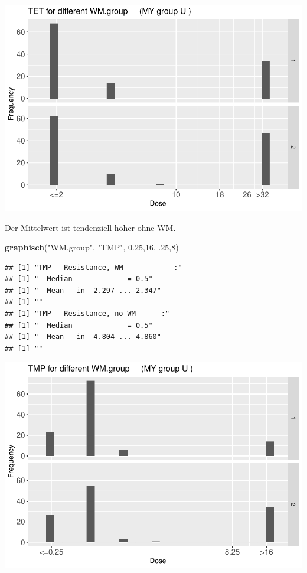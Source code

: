 \documentclass[
]{article}
\newenvironment{Shaded}{\begin{snugshade}}{\end{snugshade}}
\newcommand{\DecValTok}[1]{\textcolor[rgb]{0.00,0.00,0.81}{#1}}
\newcommand{\FloatTok}[1]{\textcolor[rgb]{0.00,0.00,0.81}{#1}}
\newcommand{\KeywordTok}[1]{\textcolor[rgb]{0.13,0.29,0.53}{\textbf{#1}}}
\newcommand{\NormalTok}[1]{#1}
\newcommand{\StringTok}[1]{\textcolor[rgb]{0.31,0.60,0.02}{#1}}
\begin{document}
\includegraphics{Verteilungen_files/figure-latex/unnamed-chunk-41-1.pdf}

Der Mittelwert ist tendenziell höher ohne WM.

\begin{Shaded}
\begin{Highlighting}[]
  \KeywordTok{graphisch}\NormalTok{(}\StringTok{"WM.group"}\NormalTok{, }\StringTok{"TMP"}\NormalTok{, }\FloatTok{0.25}\NormalTok{,}\DecValTok{16}\NormalTok{, }\FloatTok{.25}\NormalTok{,}\DecValTok{8}\NormalTok{) }
\end{Highlighting}
\end{Shaded}

\begin{verbatim}
## [1] "TMP - Resistance, WM            :"
## [1] "  Median             = 0.5"
## [1] "  Mean   in  2.297 ... 2.347"
## [1] ""
## [1] "TMP - Resistance, no WM      :"
## [1] "  Median             = 0.5"
## [1] "  Mean   in  4.804 ... 4.860"
## [1] ""
\end{verbatim}

\includegraphics{Verteilungen_files/figure-latex/unnamed-chunk-42-1.pdf}
\end{document}
